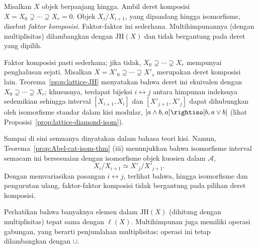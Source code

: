 \begin{definisiteorema}\label{def:JH}
\sloppy
Misalkan $X$ objek berpanjang hingga. Ambil deret komposisi
$X=X_0\supsetneq\cdots\supsetneq X_r=0$. Objek $X_i/X_{i+1}$, yang dipandang
hingga isomorfisme, disebut \emph{faktor komposisi}. Faktor-faktor ini sederhana.
Multihimpunannya (dengan multiplisitas) dilambangkan dengan $\mathrm{JH}(X)$
dan tidak bergantung pada deret yang dipilih.
\fussy
\end{definisiteorema}
\begin{bukti}
    Faktor komposisi pasti sederhana; jika tidak, $X_0\supsetneq\cdots\supsetneq
X_r$ mempunyai penghalusan sejati. Misalkan
$X=X'_0\supsetneq\cdots\supsetneq X'_s$ merupakan deret komposisi lain.
Teorema~\ref{prop:lattice-JH} menyatakan bahwa deret ini ekuivalen dengan
$X_0\supsetneq\cdots\supsetneq X_r$; khususnya, terdapat bijeksi
$i\leftrightarrow j$ antara himpunan indeksnya sedemikian sehingga interval
$\left[X_{i+1},X_i\right]$ dan $\left[X'_{j+1},X'_j\right]$ dapat dihubungkan
oleh isomorfisme standar dalam kisi modular,
$[a\wedge b,a]\rightiso[b,a\vee b]$ (lihat
Proposisi~\ref{prop:lattice-diamond-isom}).

    Sampai di sini semuanya dinyatakan dalam bahasa teori kisi. Namun,
Teorema~\ref{prop:Abel-cat-isom-thm} (iii) menunjukkan bahwa isomorfisme
interval semacam ini bersesuaian dengan isomorfisme objek kuosien dalam
$\mathcal{A}$,
\[ X_i/X_{i+1} \simeq X'_j/X'_{j+1}. \]
Dengan memvariasikan pasangan $i\leftrightarrow j$, terlihat bahwa, hingga isomorfisme
dan pengurutan ulang, faktor-faktor komposisi tidak bergantung pada pilihan
deret komposisi.
\end{bukti}

Perhatikan bahwa banyaknya elemen dalam $\mathrm{JH}(X)$ (dihitung dengan
multiplisitas) tepat sama dengan $\ell(X)$. Multihimpunan juga memiliki operasi
gabungan, yang berarti penjumlahan multiplisitas; operasi ini tetap
dilambangkan dengan $\cup$.

